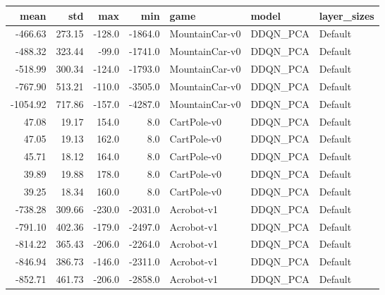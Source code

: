 \begin{tabular}{rrrrlll}
\toprule
    mean &     std &    max &     min &            game &     model & layer\_sizes \\
\midrule
 -466.63 &  273.15 & -128.0 & -1864.0 &  MountainCar-v0 &  DDQN\_PCA &     Default \\
 -488.32 &  323.44 &  -99.0 & -1741.0 &  MountainCar-v0 &  DDQN\_PCA &     Default \\
 -518.99 &  300.34 & -124.0 & -1793.0 &  MountainCar-v0 &  DDQN\_PCA &     Default \\
 -767.90 &  513.21 & -110.0 & -3505.0 &  MountainCar-v0 &  DDQN\_PCA &     Default \\
-1054.92 &  717.86 & -157.0 & -4287.0 &  MountainCar-v0 &  DDQN\_PCA &     Default \\
   47.08 &   19.17 &  154.0 &     8.0 &     CartPole-v0 &  DDQN\_PCA &     Default \\
   47.05 &   19.13 &  162.0 &     8.0 &     CartPole-v0 &  DDQN\_PCA &     Default \\
   45.71 &   18.12 &  164.0 &     8.0 &     CartPole-v0 &  DDQN\_PCA &     Default \\
   39.89 &   19.88 &  178.0 &     8.0 &     CartPole-v0 &  DDQN\_PCA &     Default \\
   39.25 &   18.34 &  160.0 &     8.0 &     CartPole-v0 &  DDQN\_PCA &     Default \\
 -738.28 &  309.66 & -230.0 & -2031.0 &      Acrobot-v1 &  DDQN\_PCA &     Default \\
 -791.10 &  402.36 & -179.0 & -2497.0 &      Acrobot-v1 &  DDQN\_PCA &     Default \\
 -814.22 &  365.43 & -206.0 & -2264.0 &      Acrobot-v1 &  DDQN\_PCA &     Default \\
 -846.94 &  386.73 & -146.0 & -2311.0 &      Acrobot-v1 &  DDQN\_PCA &     Default \\
 -852.71 &  461.73 & -206.0 & -2858.0 &      Acrobot-v1 &  DDQN\_PCA &     Default \\
\bottomrule
\end{tabular}
